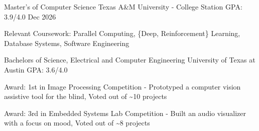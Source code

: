 

\begin{cventries}

  \cventry
    {Master's of Computer Science} %
    {Texas A\&M University - College Station} %
    {GPA: 3.9/4.0} %
    {Dec 2026} %
    {
      \begin{cvitems} %
        \item {Relevant Coursework: Parallel Computing, \{Deep, Reinforcement\} Learning, Database Systems, Software Engineering}
      \end{cvitems}
    }

  \cventry
    {Bachelors of Science, Electrical and Computer Engineering} %
    {University of Texas at Austin} %
    {GPA: 3.6/4.0} %
    {} %
    {
      \begin{cvitems} %
        \item {Award: 1st in Image Processing Competition - Prototyped a computer vision assistive tool for the blind, Voted out of \textasciitilde10 projects}
        \item {Award: 3rd in Embedded Systems Lab Competition - Built an audio visualizer with a focus on mood, Voted out of \textasciitilde8 projects}
      \end{cvitems}
    }

\end{cventries}
